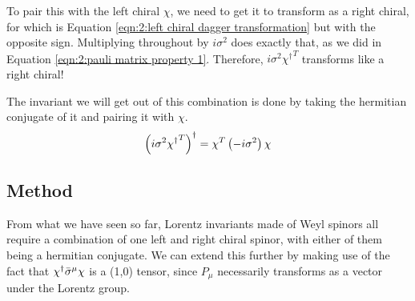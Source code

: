 To pair this with the left chiral $\chi$, we need to get it to transform as a right chiral, for which is Equation \ref{eqn:2:left chiral dagger transformation} but with the opposite sign. Multiplying throughout by $i \sigma^2$ does exactly that, as we did in Equation \ref{eqn:2:pauli matrix property 1}. Therefore, $i \sigma^2 {\chi^\dagger}^T$ transforms like a right chiral!

The invariant we will get out of this combination is done by taking the hermitian conjugate of it and pairing it with $\chi$.
\begin{equation}
    \lc i \sigma^2 {\chi^\dagger}^T \rc^\dagger = \chi^T \lc -i \sigma^2 \rc \chi
    \label{eqn:2:left chirals invariant}
\end{equation}

\subsection{Method}
\label{ch:2:lorentz invariances:method}
From what we have seen so far, Lorentz invariants made of Weyl spinors all require a combination of one left and right chiral spinor, with either of them being a hermitian conjugate. We can extend this further by making use of the fact that $\chi^\dagger \Bar{\sigma}^\mu \chi$ is a (1,0) tensor, since $P_\mu$ necessarily transforms as a vector under the Lorentz group.

